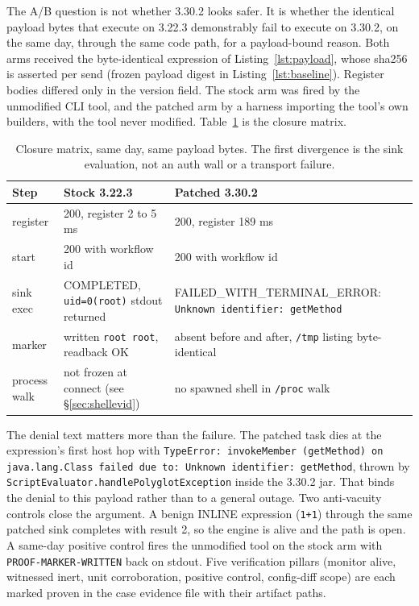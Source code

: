 \documentclass[journal]{IEEEtran}
\begin{document}
The A/B question is not whether 3.30.2 looks safer. It is whether the
identical payload bytes that execute on 3.22.3 demonstrably fail to execute on
3.30.2, on the same day, through the same code path, for a payload-bound
reason. Both arms received the byte-identical expression of
Listing~\ref{lst:payload}, whose sha256 is asserted per send (frozen payload
digest in Listing~\ref{lst:baseline}). Register bodies differed only in the
version field. The stock arm was fired by the unmodified CLI tool, and the
patched arm by a harness importing the tool's own builders, with the tool
never modified. Table~\ref{tab:closure} is the closure matrix.


\begin{table}[t]
\centering
\caption{Closure matrix, same day, same payload bytes. The first divergence
is the sink evaluation, not an auth wall or a transport failure.}
\label{tab:closure}
\footnotesize
\begin{tabular}{@{}p{1.35cm}p{3.0cm}p{3.3cm}@{}}
\toprule
Step & Stock 3.22.3 & Patched 3.30.2 \\
\midrule
register & 200, register 2 to 5 ms & 200, register 189 ms \\
start & 200 with workflow id & 200 with workflow id \\
sink exec & COMPLETED, \texttt{uid=0(root)} stdout returned &
FAILED\allowbreak\_WITH\allowbreak\_TERMINAL\allowbreak\_ERROR:
\texttt{Unknown identifier: getMethod} \\
marker & written \texttt{root root}, readback OK & absent before and after,
\texttt{/tmp} listing byte-identical \\
process walk & not frozen at connect (see \S\ref{sec:shellevid}) & no
spawned shell in \texttt{/proc} walk \\
\bottomrule
\end{tabular}
\end{table}

The denial text matters more than the failure. The patched task dies at the
expression's first host hop with \texttt{TypeError: invokeMember (getMethod)
on java.lang.Class failed due to: Unknown identifier: getMethod}, thrown by
\texttt{ScriptEvaluator.handlePolyglotException} inside the 3.30.2 jar. That
binds the denial to this payload rather than to a general outage. Two
anti-vacuity controls close the argument. A benign INLINE expression
(\texttt{1+1}) through the same patched sink completes with result 2, so the
engine is alive and the path is open. A same-day positive control fires the
unmodified tool on the stock arm with \texttt{PROOF-MARKER-WRITTEN} back on
stdout. Five verification pillars (monitor alive, witnessed inert, unit
corroboration, positive control, config-diff scope) are each marked proven in
the case evidence file with their artifact paths.
\end{document}
